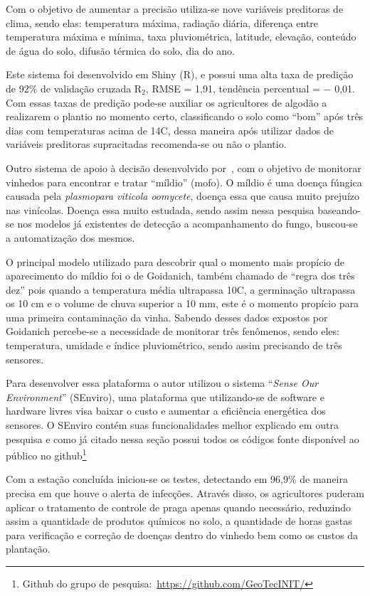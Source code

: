 \documentclass[
article,			%
12pt,				%
oneside,			%
a4paper,			%
english,			%
brazil,				%
sumario=tradicional
]{abntex2}
\begin{document}
Com o objetivo de aumentar a precisão utiliza-se nove variáveis preditoras de clima, sendo elas: temperatura máxima, radiação diária, diferença entre temperatura máxima e mínima, taxa pluviométrica, latitude, elevação, conteúdo de água do solo, difusão térmica do solo, dia do ano.

Este sistema foi desenvolvido em Shiny (R), e possui uma alta taxa de predição de 92\% de validação cruzada R$_{2}$, RMSE = 1,91, tendência percentual = $-$ 0,01.
Com essas taxas de predição pode-se auxiliar os agricultores de algodão a realizarem o plantio no momento certo, classificando o solo como ``bom'' após três dias com temperaturas acima de 14\textdegree C, dessa maneira após utilizar dados de variáveis preditoras supracitadas recomenda-se ou não o plantio.

Outro sistema de apoio à decisão desenvolvido por~\citeauthor{2}, com o objetivo de monitorar vinhedos para encontrar e tratar ``míldio'' (mofo).
O míldio é uma doença fúngica causada pela \textit{plasmopara viticola oomycete}, doença essa que causa muito prejuízo nas vinícolas\cite{2}. Doença essa muito estudada, sendo assim nessa pesquisa baseando-se nos modelos já existentes de detecção a acompanhamento do fungo, buscou-se a automatização dos mesmos.

O principal modelo utilizado para descobrir qual o momento mais propício de aparecimento do míldio foi o de Goidanich\cite{detectando_milidio}, também chamado de ``regra dos três dez'' pois quando a temperatura média ultrapassa 10\textdegree C, a germinação ultrapassa os 10 cm e o volume de chuva superior a 10 mm, este é o momento propício para uma primeira contaminação da vinha.
Sabendo desses dados expostos por Goidanich\cite{detectando_milidio} percebe-se a necessidade de monitorar três fenômenos, sendo eles: temperatura, umidade e índice pluviométrico, sendo assim precisando de três sensores.

Para desenvolver essa plataforma o autor utilizou o sistema ``\textit{Sense Our Environment}'' (SEnviro), uma plataforma que utilizando-se de software e hardware livres visa baixar o custo e aumentar a eficiência energética dos sensores\cite{2}. O SEnviro contém suas funcionalidades melhor explicado em outra pesquisa\cite{SEnviro} e como já citado nessa seção possui todos os códigos fonte disponível ao público no github\footnote{Github do grupo de pesquisa:~\url{https://github.com/GeoTecINIT/}}


Com a estação concluída iniciou-se os testes, detectando em 96,9\% de maneira precisa em que houve o alerta de infecções. Através disso, os agricultores puderam aplicar o tratamento de controle de praga apenas quando necessário, reduzindo assim a quantidade de produtos químicos no solo, a quantidade de horas gastas para verificação e correção de doenças dentro do vinhedo bem como os custos da plantação.
\end{document}
